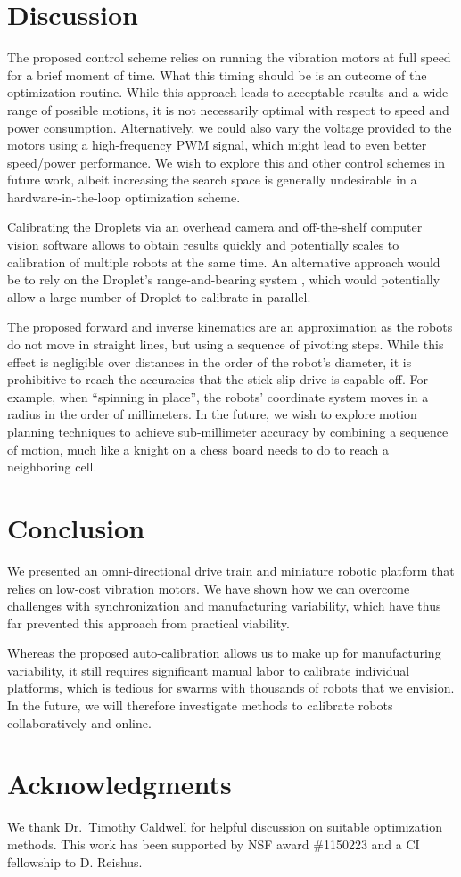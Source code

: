 \documentclass[letterpaper, 10pt, conference]{ieeeconf}
\begin{document}
\section{Discussion}
The proposed control scheme relies on running the vibration motors at full speed for a brief moment of time. What this timing should be is an outcome of the optimization routine. While this approach leads to acceptable results and a wide range of possible motions, it is not necessarily optimal with respect to speed and power consumption. Alternatively, we could also vary the voltage provided to the motors using a high-frequency PWM signal, which might lead to even better speed/power performance. We wish to explore this and other control schemes in future work, albeit increasing the search space is generally undesirable in a hardware-in-the-loop optimization scheme.  

Calibrating the Droplets via an overhead camera and off-the-shelf computer vision software allows to obtain results quickly and potentially scales to calibration of multiple robots at the same time. An alternative approach would be to rely on the Droplet's range-and-bearing system \cite{farrow14}, which would potentially allow a large number of Droplet to calibrate in parallel.

The proposed forward and inverse kinematics are an approximation as the robots do not move in straight lines, but using a sequence of pivoting steps. While this effect is negligible over distances in the order of the robot's diameter, it is prohibitive to reach the accuracies that the stick-slip drive is capable off. For example, when ``spinning in place'', the robots' coordinate system moves in a radius in the order of millimeters. In the future, we wish to explore motion planning techniques to achieve sub-millimeter accuracy by combining a sequence of motion, much like a knight on a chess board needs to do to reach a neighboring cell. 

\section{Conclusion}
We presented an omni-directional drive train and miniature robotic platform that relies on low-cost vibration motors. We have shown how we can overcome challenges with synchronization and manufacturing variability, which have thus far prevented this approach from practical viability. 

Whereas the proposed auto-calibration allows us to make up for manufacturing variability, it still requires significant manual labor to calibrate individual platforms, which is tedious for swarms with thousands of robots that we envision. In the future, we will therefore investigate methods to calibrate robots collaboratively and online.  


\section*{Acknowledgments} We thank Dr.\ Timothy Caldwell for helpful discussion on suitable optimization methods. 
This work has been supported by NSF award \#1150223 and a CI fellowship to D. Reishus.




\end{document}
